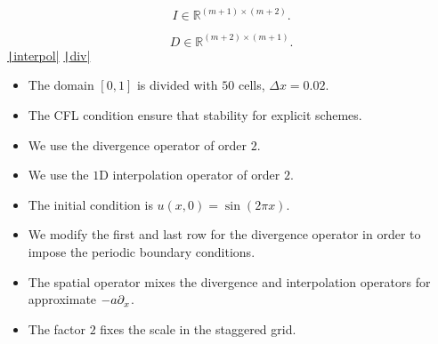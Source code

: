 \documentclass[
	8pt,
	professionalfonts,
	leqno,
	intlimits,
	c,
    aspectratio=1610,
]{beamer}
\begin{document}
\begin{frame}
    \frametitle{\secname}

    \begin{equation*}
        I\in\mathbb{R}^{\left(m+1\right)\times\left(m+2\right)}.
    \end{equation*}

    \begin{equation*}
        D\in\mathbb{R}^{\left(m+2\right)\times\left(m+1\right)}.
    \end{equation*}
    \href{https://carlosal1015.github.io/mole_examples/api_docs/matlab/src/matlab/interpol.html}{\texttt|interpol|}
    \href{https://carlosal1015.github.io/mole_examples/api_docs/matlab/src/matlab/div.html}{\texttt|div|}

    \begin{itemize}
        \item

              The domain $\left[0,1\right]$ is divided with $50$
              cells, $\Delta x=0.02$.

        \item

              The CFL condition ensure that stability for explicit
              schemes.

        \item

              We use the divergence operator of order $2$.

        \item

              We use the $1$D interpolation operator of order $2$.

        \item

              The initial condition is
              \begin{math}
                  u\left(x,0\right)=
                  \sin\left(2\pi x\right)
              \end{math}.

        \item

              We modify the first and last row for the divergence
              operator in order to impose the periodic boundary conditions.

        \item

              The spatial operator mixes the divergence and
              interpolation operators for approximate $-a\difcp{}{x}$.

        \item

              The factor $2$ fixes the scale in the staggered grid.
    \end{itemize}
\end{frame}
\end{document}

